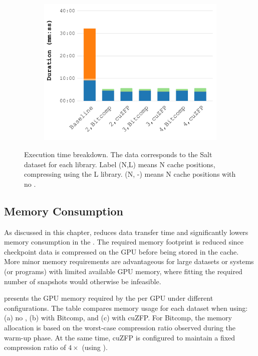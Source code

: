 \documentclass[Ingles]{ic-tese-v3}
\begin{document}
\begin{figure}[h!]
    \begin{subfigure}{0.48\textwidth}
        \includegraphics[width=\textwidth]{figures/gpuzip_breakdown/Figure7_c.pdf}
        \caption{\uniform}
        \label{fig:breakdown_uniform}
    \end{subfigure}

    \caption[Execution time breakdown (\checkpointprefetching + \compression)]{Execution time breakdown. The data corresponds to the Salt dataset for each \checkpointing library. Label (N,L) means N cache positions, compressing using the L library. (N, -) means N cache positions with no \compression.}
    \label{fig:breakdown}
\end{figure}

\subsection{Memory Consumption}
\label{sec:comppref_mem}

As discussed in this chapter, \compression reduces data transfer time and significantly lowers memory consumption in the \cache. The required memory footprint is reduced since checkpoint data is compressed on the GPU before being stored in the cache. More minor memory requirements are advantageous for large datasets or systems (or programs) with limited available GPU memory, where fitting the required number of snapshots would otherwise be infeasible.

 presents the GPU memory required by the \cache per GPU under different configurations. The table compares memory usage for each dataset when using: (a) no \compression, (b) \compression with Bitcomp, and (c) \compression with cuZFP. For Bitcomp, the memory allocation is based on the worst-case compression ratio observed during the warm-up phase. At the same time, cuZFP is configured to maintain a fixed compression ratio of $4\times$ (using ).
\end{document}
